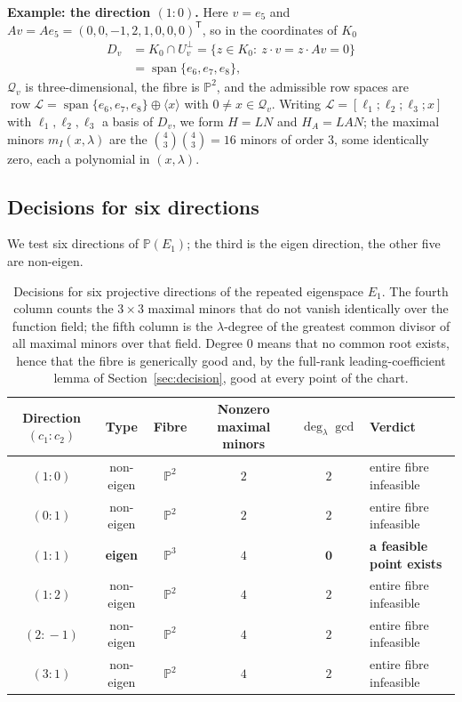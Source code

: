 \documentclass[journal]{IEEEtran}
\theoremstyle{plainn}
\theoremstyle{remark}
\newcommand{\row}{\operatorname{row}}
\begin{document}
\textbf{Example: the direction $(1\!:\!0)$.} Here $v=e_5$ and
$Av=Ae_5=(0,0,-1,2,1,0,0,0)^{\mathsf{T}}$, so in the coordinates of $K_0$
\begin{equation}\label{sec6:eq:Dv}
\begin{aligned}
D_v&=K_0\cap U_v^{\perp}=\{z\in K_0:\ z\cdot v=z\cdot Av=0\}\\
   &=\operatorname{span}\{e_6,e_7,e_8\},
\end{aligned}
\end{equation}
$\mathcal{Q}_v$ is three-dimensional, the fibre is $\mathbb{P}^{2}$, and the admissible row spaces are
$\row\mathcal{L}=\operatorname{span}\{e_6,e_7,e_8\}\oplus\langle x\rangle$ with
$0\neq x\in\mathcal{Q}_v$. Writing $\mathcal{L}=[\ell_1;\ell_2;\ell_3;x]$ with $\ell_1,\ell_2,\ell_3$ a
basis of $D_v$, we form $H=LN$ and $H_A=LAN$; the maximal minors $m_I(x,\lambda)$ are the
$\binom{4}{3}\binom{4}{3}=16$ minors of order $3$, some identically zero, each a polynomial in
$(x,\lambda)$.

\subsection{Decisions for six directions}\label{sec6:sub:six}

We test six directions of $\mathbb{P}(E_1)$; the third is the eigen direction, the other five are
non-eigen.

\begin{table}[t]
\centering
\caption{Decisions for six projective directions of the repeated eigenspace $E_1$. The fourth column
counts the $3\times3$ maximal minors that do not vanish identically over the function field; the fifth
column is the $\lambda$-degree of the greatest common divisor of all maximal minors over that field.
Degree $0$ means that no common root exists, hence that the fibre is generically good and, by the
full-rank leading-coefficient lemma of Section~\ref{sec:decision}, good at every point of the chart.}
\label{sec6:tab:dirs}
\begin{tabular}{@{}cccccl@{}}
\toprule
Direction $(c_1\!:\!c_2)$ & Type & Fibre & Nonzero maximal minors & $\deg_\lambda\gcd$ & Verdict\\
\midrule
$(1\!:\!0)$ & non-eigen & $\mathbb{P}^{2}$ & $2$ & $2$ & entire fibre infeasible\\
$(0\!:\!1)$ & non-eigen & $\mathbb{P}^{2}$ & $2$ & $2$ & entire fibre infeasible\\
$(1\!:\!1)$ & \textbf{eigen} & $\mathbb{P}^{3}$ & $4$ & $\mathbf{0}$ & \textbf{a feasible point exists}\\
$(1\!:\!2)$ & non-eigen & $\mathbb{P}^{2}$ & $4$ & $2$ & entire fibre infeasible\\
$(2\!:\!-1)$ & non-eigen & $\mathbb{P}^{2}$ & $4$ & $2$ & entire fibre infeasible\\
$(3\!:\!1)$ & non-eigen & $\mathbb{P}^{2}$ & $4$ & $2$ & entire fibre infeasible\\
\bottomrule
\end{tabular}
\end{table}
\end{document}
